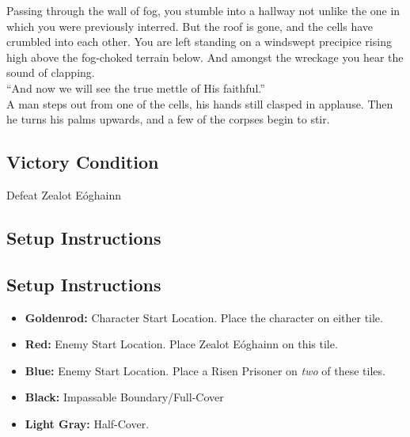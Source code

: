 Passing through the wall of fog, you stumble into a hallway not unlike the one in which you were previously interred. But the roof is gone, and the cells have crumbled into each other. You are left standing on a windswept precipice rising high above the fog-choked terrain below. And amongst the wreckage you hear the sound of clapping.\\
“And now we will see the true mettle of His faithful.”\\
A man steps out from one of the cells, his hands still clasped in applause. Then he turns his palms upwards, and a few of the corpses begin to stir.\\

\subsection*{Victory Condition}
Defeat Zealot Eóghainn

\subsection*{Setup Instructions}
\begin{center}
\end{center}

\subsection*{Setup Instructions}
\begin{itemize}
\item \textbf{Goldenrod:} Character Start Location. Place the character on either tile.
\item \textbf{Red:} Enemy Start Location. Place Zealot Eóghainn on this tile.
\item \textbf{Blue:} Enemy Start Location. Place a Risen Prisoner on \emph{two} of these tiles.
\item \textbf{Black:} Impassable Boundary/Full-Cover
\item \textbf{Light Gray:} Half-Cover.
\end{itemize}

